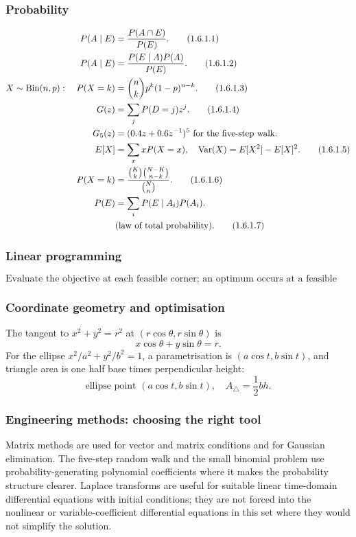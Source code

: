 \subsubsection{Probability}
\begin{align}
P(A\mid E)&=\frac{P(A\cap E)}{P(E)}. \tag{1.6.1.1}\\
P(A\mid E)&=\frac{P(E\mid A)P(A)}{P(E)}. \tag{1.6.1.2}\\
X\sim\operatorname{Bin}(n,p):\quad P(X=k)&=\binom nkp^k(1-p)^{n-k}. \tag{1.6.1.3}\\
G(z)&=\sum_jP(D=j)z^j. \tag{1.6.1.4}\\
G_5(z)&=(0.4z+0.6z^{-1})^5 \text{ for the five-step walk}. \notag\\
E[X]&=\sum_x xP(X=x),\quad \operatorname{Var}(X)=E[X^2]-E[X]^2. \tag{1.6.1.5}\\
P(X=k)&=\frac{\binom{K}{k}\binom{N-K}{n-k}}{\binom Nn}. \tag{1.6.1.6}\\
P(E)&=\sum_iP(E\mid A_i)P(A_i). \\
&\text{(law of total probability).} \tag{1.6.1.7}
\end{align}

\subsubsection{Linear programming}
\[\text{Evaluate the objective at each feasible corner; an optimum occurs at a feasible vertex.}\tag{1.7.1.1}\]

\subsubsection{Coordinate geometry and optimisation}
The tangent to $x^2+y^2=r^2$ at $(r\cos\theta,r\sin\theta)$ is
\[
x\cos\theta+y\sin\theta=r.\tag{1.8.1.1}
\]
For the ellipse $x^2/a^2+y^2/b^2=1$, a parametrisation is $(a\cos t,b\sin t)$, and triangle area is one half base times perpendicular height:
\[\text{ellipse point }(a\cos t,b\sin t),\quad A_{\triangle}=\frac12 bh.\tag{1.8.1.2}\]

\subsubsection{Engineering methods: choosing the right tool}
Matrix methods are used for vector and matrix conditions and for Gaussian elimination. The five-step random walk and the small binomial problem use probability-generating polynomial coefficients where it makes the probability structure clearer. Laplace transforms are useful for suitable linear time-domain differential equations with initial conditions; they are not forced into the nonlinear or variable-coefficient differential equations in this set where they would not simplify the solution.
